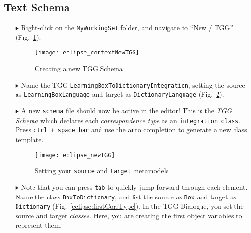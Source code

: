 \newpage
\hypertarget{schema tex}{}
\subsection{Text Schema}
\texHeader

\begin{itemize}

\item[$\blacktriangleright$] Right-click on the \texttt{MyWorkingSet} folder, and navigate to ``New / TGG'' (Fig.~\ref{eclipse:contextTGG}).

\vspace{0.5cm}

\begin{figure}[htbp]
\begin{center}
  \texttt{[image: eclipse\_contextNewTGG]}
  \caption{Creating a new TGG Schema}
  \label{eclipse:contextTGG}
\end{center}
\end{figure}

\item[$\blacktriangleright$] Name the TGG \texttt{LearningBoxToDictionaryIntegration}, setting the source as \texttt{LearningBoxLanguage} and target as
\texttt{DictionaryLanguage} (Fig.~\ref{eclipse:newTGG}).

\item[$\blacktriangleright$] A new \texttt{schema} file should now be active in the editor! This is the \emph{TGG Schema} which declares each
\emph{correspondence type} as an \texttt{integration class}. Press \texttt{ctrl + space bar} and use the auto completion to generate a new class template.

\newpage

\begin{figure}[htbp]
\begin{center}
  \texttt{[image: eclipse\_newTGG]}
  \caption{Setting your \texttt{source} and \texttt{target} metamodels}
  \label{eclipse:newTGG}
\end{center}
\end{figure}

\item[$\blacktriangleright$] Note that you can press \texttt{tab} to quickly jump forward through each element. Name the class \texttt{BoxToDictionary}, and
list the source as \texttt{Box} and target as \texttt{Dictionary} (Fig.~\ref{eclipse:firstCorrType}). In the TGG Dialogue, you set the source and target
\emph{classes}.
Here, you are creating the first object variables to represent them. 


\end{itemize}
